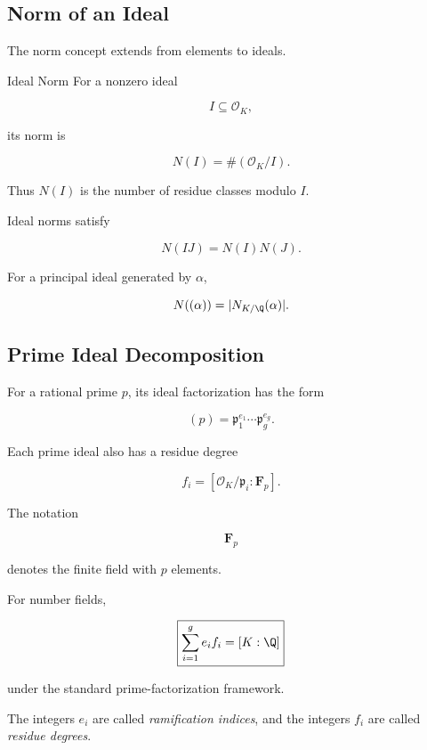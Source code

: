 \subsection{Norm of an Ideal}
\label{subsec:ideal-norm}

The norm concept extends from elements to ideals.

\begin{definitionbox}{Ideal Norm}
For a nonzero ideal

\[ I\subseteq\mathcal O_K, \]

its norm is

\[ N(I)=\#(\mathcal O_K/I). \]
\end{definitionbox}

Thus \(N(I)\) is the number of residue classes modulo \(I\).

Ideal norms satisfy

\[ \boxed{N(IJ)=N(I)N(J).} \]

For a principal ideal generated by \(\alpha\),

\[ N((\alpha))=|N_{K/\Q}(\alpha)|. \]

\subsection{Prime Ideal Decomposition}
\label{subsec:prime-ideal-decomposition}

For a rational prime \(p\), its ideal factorization has the form

\[ (p)=\mathfrak p_1^{e_1}\cdots\mathfrak p_g^{e_g}. \]

Each prime ideal also has a residue degree

\[ f_i=[\mathcal O_K/\mathfrak p_i:\mathbf F_p]. \]

The notation

\[ \mathbf F_p \]

denotes the finite field with \(p\) elements.

For number fields,

\[ \boxed{\sum_{i=1}^{g}e_i f_i=[K:\Q]} \]

under the standard prime-factorization framework.

The integers \(e_i\) are called \emph{ramification indices}, and the
integers \(f_i\) are called \emph{residue degrees}.

